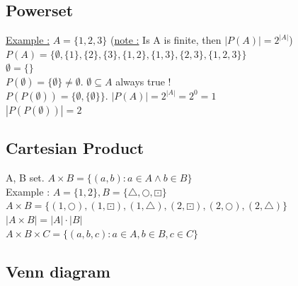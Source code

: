 \documentclass[12pt,a4paper]{article}
\begin{document}
\subsection{Powerset}
\begin{center}
\end{center}
\underline{Example :} $A = \{1,2,3\}$ (\underline{note :} Is A is finite, then $|P(A)| = 2^{|A|}$)\\
$P(A) = \{\emptyset, \{1\}, \{2\}, \{3\}, \{1,2\}, \{1,3\}, \{2,3\}, \{1,2,3\}\}$\\
$\emptyset = \{\}$\\
$P(\emptyset) = \{\emptyset\} \neq \emptyset$. $\emptyset \subseteq A$ always true !\\
$P(P(\emptyset)) = \{\emptyset, \{\emptyset\}\}$. $|P(A)| = 2^{|A|} = 2^0 = 1$\\
$|P(P(\emptyset))| = 2$

\subsection{Cartesian Product}
A, B set. $A \times B = \{(a,b) : a \in A \wedge b \in B\}$\\
Example : $A = \{1,2\}, B = \{\bigtriangleup, \bigcirc, \boxdot\}$\\
$A \times B = \{(1,\bigcirc), (1,\boxdot), (1,\bigtriangleup), (2,\boxdot), (2,\bigcirc), (2,\bigtriangleup)\}$\\
$|A \times B| = |A| \cdot |B|$\\
$A \times B \times C = \{(a,b,c) : a \in A, b \in B, c \in C\}$

\subsection{Venn diagram}
\end{document}
